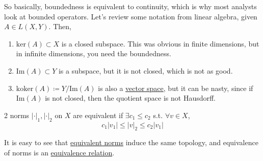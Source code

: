   So basically, boundedness is equivalent to continuity, which is why most analysts look at bounded operators. Let's review some notation from linear algebra, given $A \in L(X, Y)$. Then, 
  \begin{enumerate}
    \item $\mathrm{ker}(A) \subset X$ is a closed subspace. This was obvious in finite dimensions, but in infinite dimensions, you need the boundedness. 
    \item $\mathrm{Im}(A) \subset Y$ is a subspace, but it is not closed, which is not as good. 
    \item $\mathrm{koker}(A) \coloneqq Y / \mathrm{Im}(A)$ is also a \hyperref[lin-def:vector-space]{vector space}, but it can be nasty, since if $\mathrm{Im}(A)$ is not closed, then the quotient space is not Hausdorff. 
  \end{enumerate} 

  \begin{definition}
    \label{def:equivalent-norms}
    2 norms $|\cdot|_1, |\cdot|_2$ on $X$ are equivalent if $\exists c_1 \leq c_2$ s.t. $\forall v \in X$, 
    \begin{equation}
      c_1 |v_1| \leq |v|_2 \leq c_2 |v_1|
    \end{equation}
  \end{definition}

  It is easy to see that \hyperref[def:equivalent-norms]{equivalent norms} induce the same topology, and equivalence of norms is an \hyperref[st-def:equivalence_relation]{equivalence relation}. 

